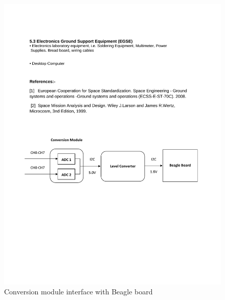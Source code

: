 \begin{figure}[bht]
\centering
\includegraphics[scale=0.7]{figures/conversion_module.pdf}
\caption{Conversion module interface with Beagle board}
\label{fig:conversion_module}
\end{figure}
%
%
